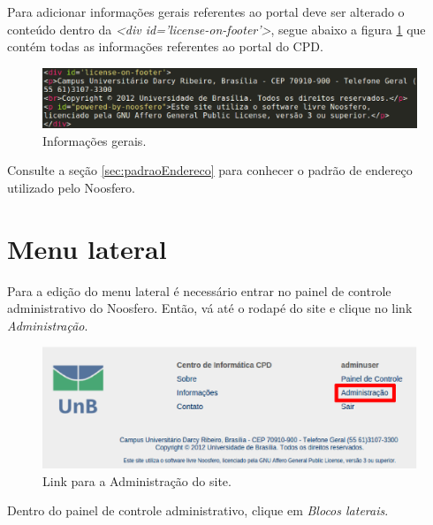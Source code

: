 \newpage
Para adicionar informações gerais referentes ao portal deve ser alterado o conteúdo dentro da \emph{<div id='license-on-footer'>}, segue abaixo a figura \ref{fig:infGeral} que contém todas as informações referentes ao portal do CPD.

\begin{figure}[h]
     \centering
       \includegraphics[keepaspectratio=true,scale=0.49]{figuras/informacoesGeraisRodape.eps}
     \caption{Informações gerais.}
     \label{fig:infGeral}
\end{figure}

Consulte a seção \ref{sec:padraoEndereco} para conhecer o padrão de endereço utilizado pelo Noosfero.

\section{Menu lateral}

Para a edição do menu lateral é necessário entrar no painel de controle administrativo do Noosfero. Então, vá até o rodapé do site e clique no link \emph{\color{red}Administração}.

\begin{figure}[h]
     \centering
       \includegraphics[keepaspectratio=true,scale=0.6]{figuras/linkAdmin.eps}
     \caption{Link para a Administração do site.}
     \label{fig:linkAdmin}
\end{figure}

\newpage
Dentro do painel de controle administrativo, clique em \emph{\color{red}Blocos laterais}.

